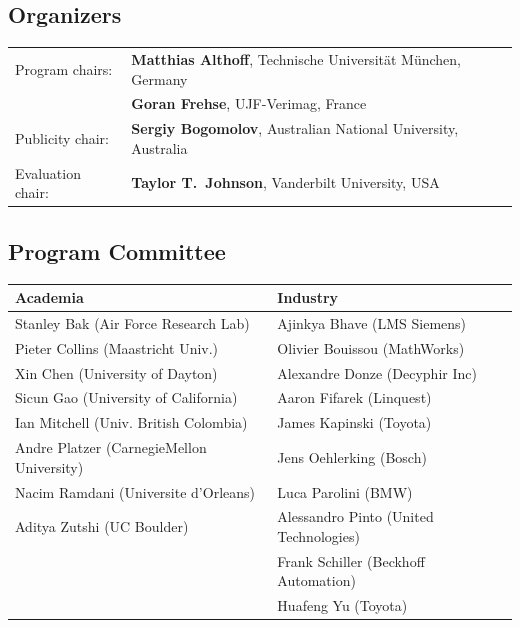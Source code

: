 \documentclass[a4paper,10pt]{article}
\begin{document}
\subsection*{Organizers}

\begin{tabular}{ll}
 Program chairs: & \textbf{Matthias Althoff}, Technische Universit\"at M\"unchen, Germany \\
                 & \textbf{Goran Frehse}, UJF-Verimag, France \\[0.1cm]
 Publicity chair:  & \textbf{Sergiy Bogomolov}, Australian National University, Australia \\
 Evaluation chair: & \textbf{Taylor T.~Johnson}, Vanderbilt University, USA
\end{tabular}


\subsection*{Program Committee}

{\small
\begin{center}
\begin{tabular}{ll}
\hline
Academia & Industry \\ \hline
Stanley Bak (Air Force Research Lab) 	& Ajinkya Bhave (LMS Siemens) \\
Pieter Collins (Maastricht Univ.) 	& Olivier Bouissou (MathWorks) \\
Xin Chen (University of Dayton) 	& Alexandre Donze (Decyphir Inc) \\
Sicun Gao (University of California) 	& Aaron Fifarek (Linquest) \\
Ian Mitchell (Univ. British Colombia) 	& James Kapinski (Toyota) \\
Andre Platzer (CarnegieMellon University) 	& Jens Oehlerking (Bosch) \\
Nacim Ramdani (Universite d'Orleans) 	& Luca Parolini (BMW) \\
Aditya Zutshi (UC Boulder) 	& Alessandro Pinto (United Technologies) \\
	& Frank Schiller (Beckhoff Automation) \\
	& Huafeng Yu (Toyota) \\ \hline
\end{tabular}
\end{center}}
\end{document}
